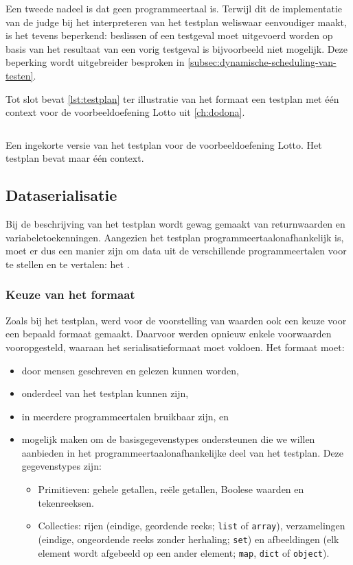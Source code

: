 Een tweede nadeel is dat  geen programmeertaal is.
Terwijl dit de implementatie van de judge bij het interpreteren van het testplan weliswaar eenvoudiger maakt, is het tevens beperkend: beslissen of een testgeval moet uitgevoerd worden op basis van het resultaat van een vorig testgeval is bijvoorbeeld niet mogelijk.
Deze beperking wordt uitgebreider besproken in \cref{subsec:dynamische-scheduling-van-testen}.

Tot slot bevat \cref{lst:testplan} ter illustratie van het formaat een testplan met één context voor de voorbeeldoefening Lotto uit \cref{ch:dodona}.

\begin{listing}
    \inputminted{python}{code/testplan.json}
    \caption{
        Een ingekorte versie van het testplan voor de voorbeeldoefening Lotto.
        Het testplan bevat maar één context.
    }
    \label{lst:testplan}
\end{listing}

\subsection{Dataserialisatie}\label{subsec:dataserialisatie}

Bij de beschrijving van het testplan wordt gewag gemaakt van returnwaarden en variabeletoekenningen.
Aangezien het testplan programmeertaalonafhankelijk is, moet er dus een manier zijn om data uit de verschillende programmeertalen voor te stellen en te vertalen: het .

\subsubsection{Keuze van het formaat}

Zoals bij het testplan, werd voor de voorstelling van waarden ook een keuze voor een bepaald formaat gemaakt.
Daarvoor werden opnieuw enkele voorwaarden vooropgesteld, waaraan het serialisatieformaat moet voldoen.
Het formaat moet:

\begin{itemize}
    \item door mensen geschreven en gelezen kunnen worden,
    \item onderdeel van het testplan kunnen zijn,
    \item in meerdere programmeertalen bruikbaar zijn, en
    \item mogelijk maken om de basisgegevenstypes ondersteunen die we willen aanbieden in het programmeertaalonafhankelijke deel van het testplan.
    Deze gegevenstypes zijn:
    \begin{itemize}
        \item Primitieven: gehele getallen, reële getallen, Boolese waarden en tekenreeksen.
        \item Collecties: rijen (eindige, geordende reeks; \texttt{list} of \texttt{array}), verzamelingen (eindige, ongeordende reeks zonder herhaling; \texttt{set}) en afbeeldingen (elk element wordt afgebeeld op een ander element; \texttt{map}, \texttt{dict} of \texttt{object}).
    \end{itemize}
\end{itemize}

